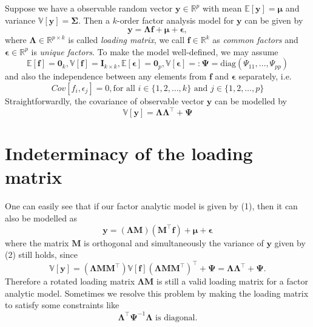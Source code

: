 \documentclass[
  a4paper,
  oneside,
  openany,
  12pt,
  onecolumn]{book}
\theoremstyle{plain}
\theoremstyle{remark}
\begin{document}
Suppose we have a observable random vector
\(\boldsymbol{y}\in \mathbb{R}^p\) with mean
\(\mathbb{E}[\boldsymbol{y}]=\boldsymbol{\mu}\) and variance
\(\mathbb{V}[\boldsymbol{y}]=\boldsymbol{\Sigma}\). Then a \(k\)-order
factor analysis model for \(\boldsymbol{y}\) can be given by
\begin{equation}
\boldsymbol{y}=\boldsymbol{\Lambda} \boldsymbol{f}+\boldsymbol{\mu}+\boldsymbol{\epsilon},
\end{equation} where
\(\boldsymbol{\Lambda} \in \mathbb{R}^{p \times k}\) is called
\emph{loading matrix}, we call \(\boldsymbol{f} \in \mathbb{R}^{k}\) as
\emph{common factors} and \(\boldsymbol{\epsilon} \in \mathbb{R}^{p}\)
is \emph{unique factors}. To make the model well-defined, we may assume
\[\mathbb{E}[\boldsymbol{f}]=\boldsymbol{0}_k, \mathbb{V}[\boldsymbol{f}]=\boldsymbol{I}_{k\times k}, \mathbb{E}[\boldsymbol{\epsilon}]=\boldsymbol{0}_p, \mathbb{V}[\boldsymbol{\epsilon}]=:\boldsymbol{\Psi}=\text{diag}(\Psi_{11},\dots,\Psi_{pp})\]
and also the independence between any elements from \(\boldsymbol{f}\)
and \(\boldsymbol{\epsilon}\) separately, i.e.
\[Cov[f_i,\epsilon_j]=0, \text{for all } i\in\{1,2,\dots,k\} \text{ and } j \in \{1,2,\dots,p\}\]
Straightforwardly, the covariance of observable vector
\(\boldsymbol{y}\) can be modelled by\\
\begin{equation}
\mathbb{V}[\boldsymbol{y}]=\boldsymbol{\Lambda}\boldsymbol{\Lambda}^\top+\boldsymbol{\Psi}
\end{equation}

\section{Indeterminacy of the loading
matrix}\label{indeterminacy-of-the-loading-matrix}

One can easily see that if our factor analytic model is given by (1),
then it can also be modelled as
\[\boldsymbol{y}=(\boldsymbol{\Lambda}\boldsymbol{M})(\boldsymbol{M}^\top\boldsymbol{f}) +\boldsymbol{\mu}+\boldsymbol{\epsilon}\]
where the matrix \(\boldsymbol{M}\) is orthogonal and simultaneously the
variance of \(\boldsymbol{y}\) given by (2) still holds, since
\[\mathbb{V}[\boldsymbol{y}]=(\boldsymbol{\Lambda}\boldsymbol{M}\boldsymbol{M}^\top)\mathbb{V}[\boldsymbol{f}](\boldsymbol{\Lambda}\boldsymbol{M}\boldsymbol{M}^\top)^\top+\boldsymbol{\Psi}=\boldsymbol{\Lambda}\boldsymbol{\Lambda}^\top+\boldsymbol{\Psi}.\]
Therefore a rotated loading matrix
\(\boldsymbol{\Lambda}\boldsymbol{M}\) is still a valid loading matrix
for a factor analytic model. Sometimes we resolve this problem by making
the loading matrix to satisfy some constraints like
\citep{mardiaMultivariateAnalysis1979}
\[\boldsymbol{\Lambda}^\top \boldsymbol{\Psi}^{-1} \boldsymbol{\Lambda} \text{ is diagonal.}\]
\end{document}
